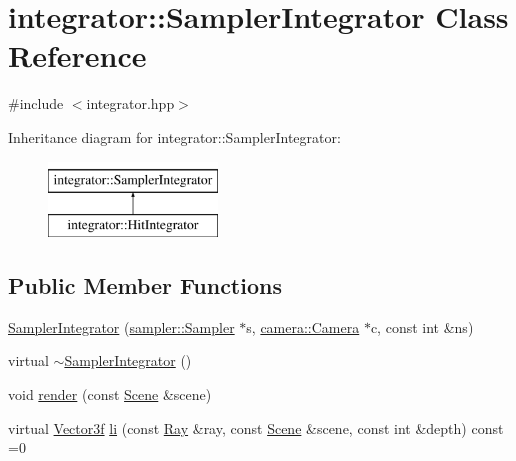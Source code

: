\hypertarget{classintegrator_1_1SamplerIntegrator}{}\section{integrator\+::Sampler\+Integrator Class Reference}
\label{classintegrator_1_1SamplerIntegrator}


{\ttfamily \#include $<$integrator.\+hpp$>$}

Inheritance diagram for integrator\+::Sampler\+Integrator\+:\begin{figure}[H]
\begin{center}
\leavevmode
\includegraphics[height=2.000000cm]{classintegrator_1_1SamplerIntegrator}
\end{center}
\end{figure}
\subsection*{Public Member Functions}
\begin{DoxyCompactItemize}
\item 
\mbox{\hyperlink{classintegrator_1_1SamplerIntegrator_ae74036826d99f191f14d6918b806601b}{Sampler\+Integrator}} (\mbox{\hyperlink{classsampler_1_1Sampler}{sampler\+::\+Sampler}} $\ast$s, \mbox{\hyperlink{classcamera_1_1Camera}{camera\+::\+Camera}} $\ast$c, const int \&ns)
\item 
virtual \mbox{\hyperlink{classintegrator_1_1SamplerIntegrator_abf145ca0ae0e151609808ad5dc6e1564}{$\sim$\+Sampler\+Integrator}} ()
\item 
void \mbox{\hyperlink{classintegrator_1_1SamplerIntegrator_af02630880edd63090b71e414b25e895f}{render}} (const \mbox{\hyperlink{classScene}{Scene}} \&scene)
\item 
virtual \mbox{\hyperlink{cyclop_8hpp_a5a0a2e85b081623ef3f7e7e8d43024f5}{Vector3f}} \mbox{\hyperlink{classintegrator_1_1SamplerIntegrator_ae08842b8b93175f1ee23a93733161181}{li}} (const \mbox{\hyperlink{classRay}{Ray}} \&ray, const \mbox{\hyperlink{classScene}{Scene}} \&scene, const int \&depth) const =0
\end{DoxyCompactItemize}
